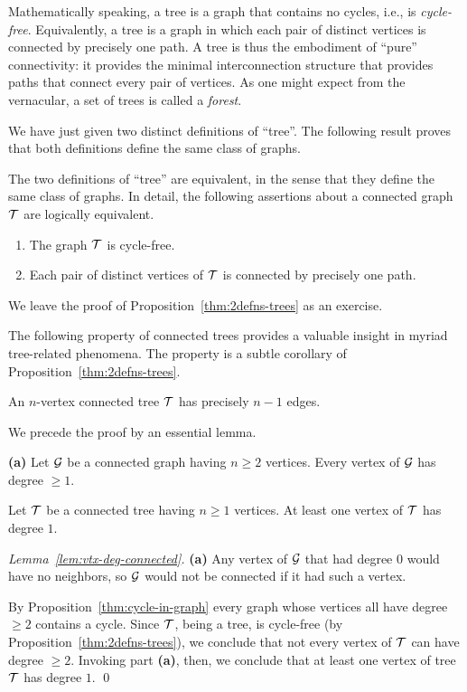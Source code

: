 Mathematically speaking, a tree is a graph that contains no cycles, i.e., is {\it cycle-free}.  
Equivalently, a tree is a graph in which each pair of distinct vertices is connected by
precisely one path.  A tree is thus the embodiment of ``pure'' connectivity: it provides the 
minimal interconnection structure that provides paths that connect every pair of vertices.  
As one might expect from the vernacular, a set of trees is called a {\it forest}. 

We have just given two distinct definitions of ``tree''.  The following result proves
that both definitions define the same class of graphs.

\begin{prop}
\label{thm:2defns-trees}
The two definitions of ``tree'' are equivalent, in the sense that they define the same
class of graphs.  In detail, the following assertions about a connected graph $\mbox{$\cal T$}$ are 
logically equivalent. 
\begin{enumerate}
\item
The graph $\mbox{$\cal T$}$ is cycle-free.
\item
Each pair of distinct vertices of $\mbox{$\cal T$}$ is connected by precisely one path.
\end{enumerate}
\end{prop}

We leave the proof of Proposition~\ref{thm:2defns-trees} as an exercise.

\medskip

The following property of connected trees provides a valuable insight in myriad
tree-related phenomena.  The property is a subtle  corollary of Proposition~\ref{thm:2defns-trees}.

\begin{prop}
\label{thm:edges-vs-nodes-tree}
An $n$-vertex connected tree $\mbox{$\cal T$}$ has precisely $n-1$ edges.
\end{prop}

We precede the proof by an essential lemma.

\begin{lemma}
\label{lem:vtx-deg-connected}
{\bf (a)}
Let $\mbox{$\cal G$}$ be a connected graph having $n \geq 2$ vertices.  Every vertex of $\mbox{$\cal G$}$ has degree $\geq 1$.

Let $\mbox{$\cal T$}$ be a connected tree having $n \geq 1$ vertices.  At least one vertex of $\mbox{$\cal T$}$ has degree $1$.
\end{lemma}

\begin{proof}[Lemma~\ref{lem:vtx-deg-connected}]
{\bf (a)} Any vertex of $\mbox{$\cal G$}$ that had degree $0$ would have no neighbors, 
so $\mbox{$\cal G$}$ would not be connected if it had such a vertex.

By Proposition~\ref{thm:cycle-in-graph} every graph whose vertices all have degree $\geq 2$
contains a cycle.  Since $\mbox{$\cal T$}$, being a tree, is cycle-free (by Proposition~\ref{thm:2defns-trees}), 
we conclude that not every vertex of $\mbox{$\cal T$}$ can have degree $\geq 2$.  Invoking part {\bf (a)}, then, 
we conclude that at least one vertex of tree $\mbox{$\cal T$}$ has degree $1$.  \qed
\end{proof}

